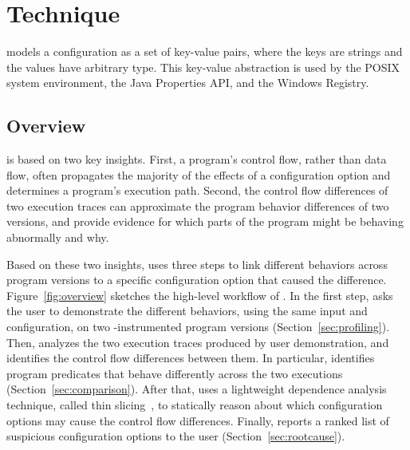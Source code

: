
\section{Technique}
\label{sec:technique}

\ourtool models a configuration as a set of key-value
pairs, where the keys are strings and the values have
arbitrary type. 
This key-value abstraction
is used by the POSIX system environment, the Java
Properties API, and the Windows Registry.


\subsection{Overview}

\ourtool is based on two key insights. First,
a program's control flow, rather than data flow, often propagates the majority of
the effects of a configuration option and determines
a program's execution path.
Second, the control flow differences of two execution
traces can approximate the program behavior differences
of two versions, and provide evidence
for which parts of the program might be behaving
abnormally and why.

Based on these two insights, \ourtool uses three
steps to link different behaviors across program
versions to a specific configuration option that caused the difference.
Figure~\ref{fig:overview} sketches the high-level workflow of
\ourtool. 
In the first step, \ourtool asks the
user to demonstrate the different behaviors, using the same input and
configuration, on two \ourtool-instrumented program versions
(Section~\ref{sec:profiling}).
Then, \ourtool analyzes the two execution traces produced
by user demonstration, and identifies the control flow differences between
them. In particular, \ourtool identifies program predicates
that behave differently across the two executions
(Section~\ref{sec:comparison}).
After that, \ourtool uses a lightweight dependence
analysis technique, called thin slicing~\cite{Sridharan:2007},
to statically reason about which configuration
options may cause the control flow differences.
Finally, \ourtool reports a ranked list of 
suspicious configuration options to the user (Section~\ref{sec:rootcause}).

